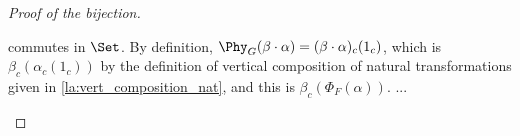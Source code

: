 \begin{proof}[Proof of the bijection]
\begin{subproof}
\[\]
commutes in $\Set$. By definition, $\Phy_{G}(\beta\cdot \alpha) = (\beta \cdot \alpha)_{c}(1_{c})$, which is
$\beta_{c}(\alpha_{c}(1_{c}))$ by the definition of vertical composition of natural transformations given in \ref{la:vert_composition_nat},
and this is $\beta_{c}(\Phi_{F}(\alpha))$.
...
\end{subproof}
\end{proof}
